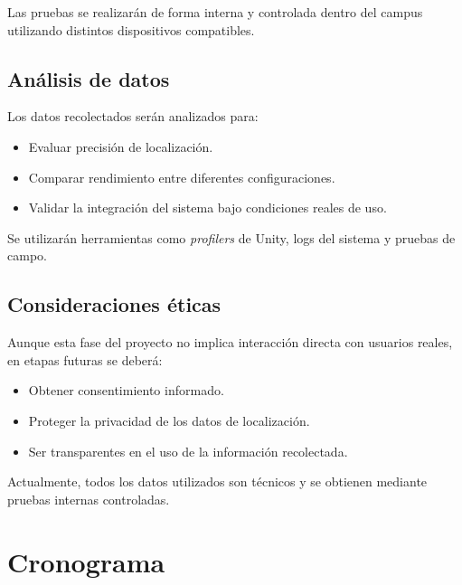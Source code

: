 \documentclass{article}
\begin{document}
Las pruebas se realizarán de forma interna y controlada dentro del campus utilizando distintos dispositivos compatibles.

\subsection{Análisis de datos}

Los datos recolectados serán analizados para:

\begin{itemize}
    \item Evaluar precisión de localización.
    \item Comparar rendimiento entre diferentes configuraciones.
    \item Validar la integración del sistema bajo condiciones reales de uso.
\end{itemize}

Se utilizarán herramientas como \textit{profilers} de Unity, logs del sistema y pruebas de campo.

\subsection{Consideraciones éticas}

Aunque esta fase del proyecto no implica interacción directa con usuarios reales, en etapas futuras se deberá:

\begin{itemize}
    \item Obtener consentimiento informado.
    \item Proteger la privacidad de los datos de localización.
    \item Ser transparentes en el uso de la información recolectada.
\end{itemize}

Actualmente, todos los datos utilizados son técnicos y se obtienen mediante pruebas internas controladas.

\newpage

\section{Cronograma}
\end{document}
